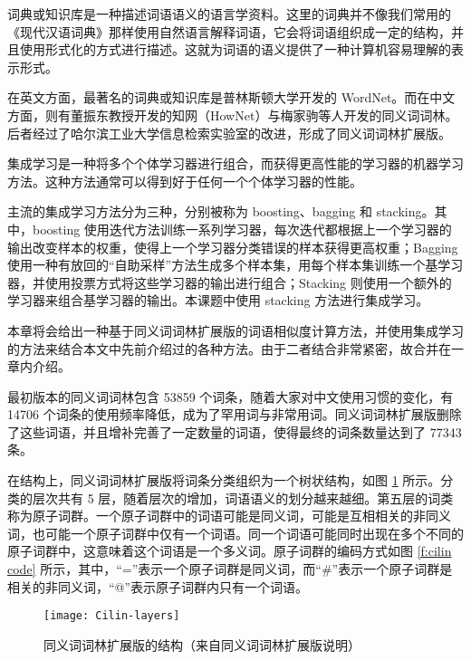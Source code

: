 
\label{c:ensemble}
词典或知识库是一种描述词语语义的语言学资料。这里的词典并不像我们常用的《现代汉语词典》那样使用自然语言解释词语，它会将词语组织成一定的结构，并且使用形式化的方式进行描述。这就为词语的语义提供了一种计算机容易理解的表示形式。

在英文方面，最著名的词典或知识库是普林斯顿大学开发的 WordNet。而在中文方面，则有董振东教授开发的知网（HowNet）与梅家驹等人开发的同义词词林。后者经过了哈尔滨工业大学信息检索实验室的改进，形成了同义词词林扩展版。

集成学习是一种将多个个体学习器进行组合，而获得更高性能的学习器的机器学习方法。这种方法通常可以得到好于任何一个个体学习器的性能。

主流的集成学习方法分为三种，分别被称为 boosting、bagging 和 stacking。其中，boosting 使用迭代方法训练一系列学习器，每次迭代都根据上一个学习器的输出改变样本的权重，使得上一个学习器分类错误的样本获得更高权重；Bagging 使用一种有放回的“自助采样”方法生成多个样本集，用每个样本集训练一个基学习器，并使用投票方式将这些学习器的输出进行组合；Stacking 则使用一个额外的学习器来组合基学习器的输出。本课题中使用 stacking 方法进行集成学习。

本章将会给出一种基于同义词词林扩展版的词语相似度计算方法，并使用集成学习的方法来结合本文中先前介绍过的各种方法。由于二者结合非常紧密，故合并在一章内介绍。

最初版本的同义词词林包含 53859 个词条，随着大家对中文使用习惯的变化，有 14706 个词条的使用频率降低，成为了罕用词与非常用词。同义词词林扩展版删除了这些词语，并且增补完善了一定数量的词语，使得最终的词条数量达到了 77343 条。

在结构上，同义词词林扩展版将词条分类组织为一个树状结构，如图 \ref{f:cilin layers} 所示。分类的层次共有 5 层，随着层次的增加，词语语义的划分越来越细。第五层的词类称为原子词群。一个原子词群中的词语可能是同义词，可能是互相相关的非同义词，也可能一个原子词群中仅有一个词语。同一个词语可能同时出现在多个不同的原子词群中，这意味着这个词语是一个多义词。原子词群的编码方式如图 \ref{f:cilin code} 所示，其中，“=”表示一个原子词群是同义词，而“\#”表示一个原子词群是相关的非同义词，“@”表示原子词群内只有一个词语。

\begin{figure}[h]
	\centering
	\texttt{[image: Cilin-layers]}
	\caption{同义词词林扩展版的结构（来自同义词词林扩展版说明）}
	\label{f:cilin layers}
	\vspace{-1em}
\end{figure}

